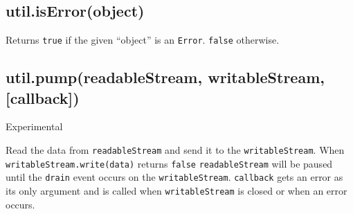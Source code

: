 \begin{Shaded}
\begin{Highlighting}[]
 \NormalTok{);}

\NormalTok{(} \NormalTok{())}
\NormalTok{(}\NormalTok{())}
\NormalTok{(\{\})}
\end{Highlighting}
\end{Shaded}

\subsection{util.isError(object)}

Returns \texttt{true} if the given ``object'' is an \texttt{Error}.
\texttt{false} otherwise.

\begin{Shaded}
\begin{Highlighting}[]
 \NormalTok{);}

\NormalTok{(} 
\NormalTok{(} 
\NormalTok{(\{ }\NormalTok{: }\NormalTok{, }\NormalTok{: } \NormalTok{\})}
\end{Highlighting}
\end{Shaded}

\subsection{util.pump(readableStream, writableStream, {[}callback{]})}

Experimental

Read the data from \texttt{readableStream} and send it to the
\texttt{writableStream}. When \texttt{writableStream.write(data)}
returns \texttt{false} \texttt{readableStream} will be paused until the
\texttt{drain} event occurs on the \texttt{writableStream}.
\texttt{callback} gets an error as its only argument and is called when
\texttt{writableStream} is closed or when an error occurs.

